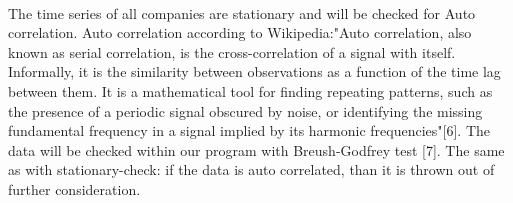 \documentclass[12pt, a4paper]{article}
\begin{document}
\\
The time series of all companies are stationary and will be checked for Auto correlation. Auto correlation according to Wikipedia:"Auto correlation, also known as serial correlation, is the cross-correlation of a signal with itself. Informally, it is the similarity between observations as a function of the time lag between them. It is a mathematical tool for finding repeating patterns, such as the presence of a periodic signal obscured by noise, or identifying the missing fundamental frequency in a signal implied by its harmonic frequencies"[6]. The data will be checked within our program with Breush-Godfrey test [7]. The same as with stationary-check: if the data is auto correlated, than it is thrown out of further consideration. 


 
\end{document}
